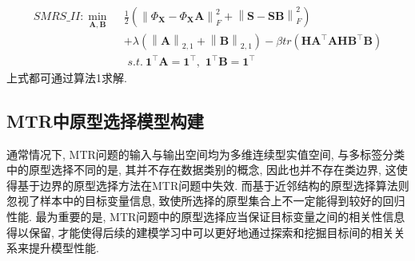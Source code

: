 \documentclass[lang=cn,10pt]{gorgeousnbook}
\numberwithin{equation}{section}%
\numberwithin{figure}{section}%
\begin{document}
\begin{equation}
    \begin{aligned}
        SMRS\_II: \min_{\boldsymbol{A},\boldsymbol{B}}\ \ &\frac{1}{2}\left( \left\| \varPhi _{\boldsymbol{X}}-\varPhi _{\boldsymbol{X}}\boldsymbol{A} \right\| _{F}^{2}+\left\| \boldsymbol{S}-\boldsymbol{S}\boldsymbol{B} \right\| _{F}^{2} \right)  \\
        & +\lambda \left( \left\| \boldsymbol{A} \right\| _{2,1}+\left\| \boldsymbol{B} \right\| _{2,1} \right)- \beta tr\left( \boldsymbol{HA}^{\top}\boldsymbol{AHB}^{\top}\boldsymbol{B} \right)\\
        & \,\,s.t.\ \mathbf{1}^{\top}\boldsymbol{A}=\mathbf{1}^{\top},\,\,\mathbf{1}^{\top}\boldsymbol{B}=\mathbf{1}^{\top}
        \end{aligned}
\end{equation}
上式都可通过算法1求解.


\subsection{MTR中原型选择模型构建}
通常情况下, MTR问题的输入与输出空间均为多维连续型实值空间, 与多标签分类中的原型选择不同的是, 其并不存在数据类别的概念, 因此也并不存在类边界, 这使得基于边界的原型选择方法在MTR问题中失效. 而基于近邻结构的原型选择算法则忽视了样本中的目标变量信息, 致使所选择的原型集合上不一定能得到较好的回归性能. 最为重要的是, MTR问题中的原型选择应当保证目标变量之间的相关性信息得以保留, 才能使得后续的建模学习中可以更好地通过探索和挖掘目标间的相关关系来提升模型性能. \cite{absil2009optimization}

\printbibliography
% 
% 
\end{document}
